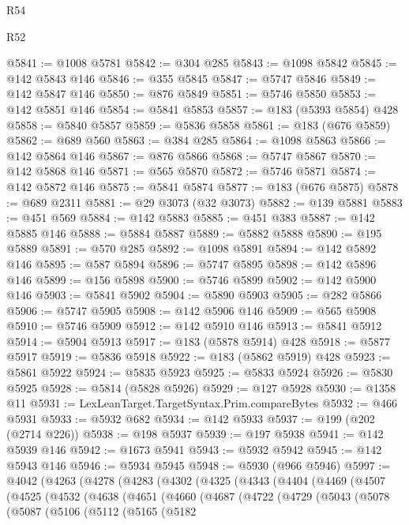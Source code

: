 \begin{lexlean}{R54}
\begin{lexlean}{R52}
\begin{coremodule}
{{{{{{{{{{{{{{{{{{{{{{{{{{{{{{{{{{{{{{{{{{{{{{{{{{{{{{{{{{{{{{{{{{{{{{{{{{{{{{{{{{{{{{{{{{{{{{{{{{{{{{{{{{{{{{{{{{{{{{{{{{{{{{{{{{{{{{{{{{{{{{{{{{{{{{{{{{{{{{{{{{{{{{{{{{{{{{{{{{{{{{{{{{{{{{{{{{{{{{@5841 := @1008 @5781
@5842 := @304 @285
@5843 := @1098 @5842
@5845 := @142 @5843 @146
@5846 := @355 @5845
@5847 := @5747 @5846
@5849 := @142 @5847 @146
@5850 := @876 @5849
@5851 := @5746 @5850
@5853 := @142 @5851 @146
@5854 := @5841 @5853
@5857 := @183 (@5393 @5854) @428
@5858 := @5840 @5857
@5859 := @5836 @5858
@5861 := @183 (@676 @5859)
@5862 := @689 @560
@5863 := @384 @285
@5864 := @1098 @5863
@5866 := @142 @5864 @146
@5867 := @876 @5866
@5868 := @5747 @5867
@5870 := @142 @5868 @146
@5871 := @565 @5870
@5872 := @5746 @5871
@5874 := @142 @5872 @146
@5875 := @5841 @5874
@5877 := @183 (@676 @5875)
@5878 := @689 @2311
@5881 := @29 @3073 (@32 @3073)
@5882 := @139 @5881
@5883 := @451 @569
@5884 := @142 @5883
@5885 := @451 @383
@5887 := @142 @5885 @146
@5888 := @5884 @5887
@5889 := @5882 @5888
@5890 := @195 @5889
@5891 := @570 @285
@5892 := @1098 @5891
@5894 := @142 @5892 @146
@5895 := @587 @5894
@5896 := @5747 @5895
@5898 := @142 @5896 @146
@5899 := @156 @5898
@5900 := @5746 @5899
@5902 := @142 @5900 @146
@5903 := @5841 @5902
@5904 := @5890 @5903
@5905 := @282 @5866
@5906 := @5747 @5905
@5908 := @142 @5906 @146
@5909 := @565 @5908
@5910 := @5746 @5909
@5912 := @142 @5910 @146
@5913 := @5841 @5912
@5914 := @5904 @5913
@5917 := @183 (@5878 @5914) @428
@5918 := @5877 @5917
@5919 := @5836 @5918
@5922 := @183 (@5862 @5919) @428
@5923 := @5861 @5922
@5924 := @5835 @5923
@5925 := @5833 @5924
@5926 := @5830 @5925
@5928 := @5814 (@5828 @5926)
@5929 := @127 @5928
@5930 := @1358 @11
@5931 := LexLeanTarget.TargetSyntax.Prim.compareBytes
@5932 := @466 @5931
@5933 := @5932 @682
@5934 := @142 @5933
@5937 := @199 (@202 (@2714 @226))
@5938 := @198 @5937
@5939 := @197 @5938
@5941 := @142 @5939 @146
@5942 := @1673 @5941
@5943 := @5932 @5942
@5945 := @142 @5943 @146
@5946 := @5934 @5945
@5948 := @5930 (@966 @5946)
@5997 := @4042
    (@4263
      (@4278
        (@4283
          (@4302
            (@4325
              (@4343
                (@4404
                  (@4469
                    (@4507
                      (@4525
                        (@4532
                          (@4638
                            (@4651
                              (@4660
                                (@4687
                                  (@4722
                                    (@4729
                                      (@5043
                                        (@5078
                                          (@5087
                                            (@5106
                                              (@5112
                                                (@5165
                                                  (@5182
}}}}}}}}}}}}}}}}}}}}}}}}}}}}}}}}}}}}}}}}}}}}}}}}}}}}}}}}}}}}}}}}}}}}}}}}}}}}}}}}}}}}}}}}}}}}}}}}}}}}}}}}}}}}}}}}}}}}}}}}}}}}}}}}}}}}}}}}}}}}}}}}}}}}}}}}}}}}}}}}}}}}}}}}}}}}}}}}}}}}}}}}}}}}}}}}}}}}}}
\end{coremodule}
\end{lexlean}
\end{lexlean}
